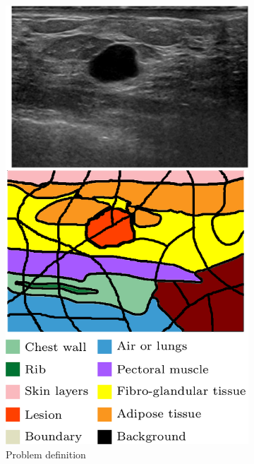\begin{figure}
    \centering
    \begin{subfigure}[b]{0.19\textwidth}
        \centering
        \includegraphics[width=\textwidth]{problem}
        \caption{{\small Problem definition}}    
        \label{fig:methodTerms:problem}
    \end{subfigure}
    \hfill
    \begin{subfigure}[b]{0.39\textwidth}  
        \centering 

\end{subfigure}
\end{figure}
